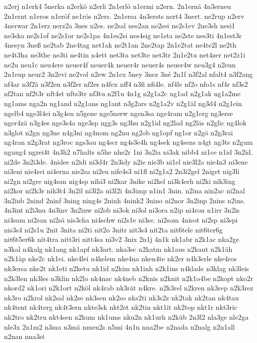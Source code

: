 {n2erj
n1erk4
5nerka
n2erkö
n2erli
2n1erlö
n1ermi
n2ern.
2n1ernä
4n3erneu
2n1ernt
n1eros
n1eröf
ne1rös
n2ers.
2n1ersa
4n3ersts
nert4
3nert.
ne2rup
n2erv
4nerwar
2n1erz
nerz2a
3nes
n2es.
ne2sal
nes2an
ne2sei
ne2s1ev
2ne3sh
nesi1
ne3ska
ne2s1of
ne2s1or
ne2s1pa
4n1es2si
nes4sig
ne1sta
ne2ste
nes3ti
4n1est3r
4nesyn
3neß
ne2tab
2ne4tag
net1ak
ne2t1an
2ne2tap
2n1e2tat
ne4te2l
ne2th
ne4t3ha
ne3the
ne3ti
ne4tin
n4ett
net3ta
net3te
net3tr
2n1e2tu
net4zer
net2z1i
ne2u
neu1c
neu4ere
neuer4f
neuer4k
neuer4r
neuer4s
neuer4w
neu3g4
n2eun
2n1eup
neur2
3n2evi
ne2vol
n2ew
2n1ex
5ney
3nez
3né
2n1f
n3f2al
nfalt4
n3f2ang
nf4ar
n3f2ä
n3f2en
n3f2er
nf2es
n4fex
nff4
n3fi
nfi4le.
nf4le
nf2o
nfo1s
nf4r
nf3s2
nf2tan
nf2t3r
nft4st
nfts3tr
nf3tu
n2f1u
4n1g
n2g1a2c
ng1ad
n2g1ak
ng1a2me
ng1ams
nga2n
ng1and
n2g1ans
ng1ant
n3g2ars
n2g1a2v
n2g1äl
ng3d4
n2g1ein
ngelb4
nge3l4ei
n3g4en
n5gene
nge5nerw
ngen3sa
nge4ram
n2g1erg
ng3erse
nger4zä
n3g4es
nge3s4a
nge3sp
ngg3s
ng3hu
n2g1id
ng2lad
ng2läs
n2glic
ng4lok
n3glot
n2gn
ng3ne
n4g3ni
ng4nom
ng2nu
ng2ob
ng1opf
ng1or
n2gö
n2g3rai
ng4ran
n2g3rat
ng3roc
ngs3au
ng4scr
ng4s3e4h
ng4sek
ng4sens
n4gt
ng3ts
n2gum
ngung4
ngzei4t
4n3h2
n7halts
n5he
nhe2r
1ni
3n2ia
ni3ak
nibb4
ni1ce
n1id
3n2id.
ni2de
3n2i3de.
4nidee
n2idi
ni3d4r
2n3idy
n2ie
nie3b
ni1el
nie3l2a
nie4n3
ni3ene
ni3eni
nie4rei
ni4erna
nie2sa
ni2eu
nife4s3
ni1fl
ni2g1a2
2n3i2gel
2niget
nig3li
ni2gn
ni2gre
nig4san
nig4sp
nihi3
ni2kar
3nike
ni2kel
ni3k4erh
ni2ki
nik3ing
ni2kor
ni2k3r
nik3t4
3n2il
ni3l2a
ni3l2i
4n3imp
n1in1
3nin.
n2ina
nin2ac
ni2nal
3n2inb
2nind
2ninf
3ning
ning4s
2ninh
4nink2
3nino
ni2nor
3n2inp
2nins
n2ins.
4n3int
n2i3nu
4n3inv
3n2inw
ni2ob
ni3ok
ni3ol
ni3ora
n2ip
ni4ron
n1irr
3n2is
ni4sam
ni2san
ni2sä
nis3cha
ni4schw
ni2s1e
ni3se.
ni2som
4nisot
ni2sp
ni3spi
nis3s4
ni2s1u
2nit
3nita
ni2ti
nit2o
3nitr
nit3s4
nit2ta
nit6tele
nit6ter6g
nit6t5er6k
nit4tra
nitt3ri
nitt4sa
ni3v2
3nix
2n1j
4n1k
nk1abr
n2k1ac
nka2ge
n3kal
n4kalg
nk1ang
nk1apf
nk3art.
nka3sc
n2katm
nk1aus
n2kaut
n2k1äh
n2k1äp
nke2c
nk1ei.
nke4lei
n4kelem
nke4na
nken4te
nk2er
n4k3erle
nke4ros
nk3ersa
nke2t
nk1eti
n2ketu
nk1id
n2kim
nk1inh
n2k1ins
n4klade
n3klag
nk3leis
n2k3len
nk3les
n3klin
nk2lo
nk4nac
nk4neb
n2knis
n2knit
n2k1o4be
n2kopt
nko2r
nkord2
nk1ori
n2k1ort
n2köl
nk4rab
nk3rät
n4kre.
n2k3rel
n2kren
nk3rep
n2k3rez
nk3ro
n2krol
nk2sal
nk2se
nk3sen
nk2so
nks2ti
nk3s2z
nk2tak
nk2tan
nk4tau
nk4tent
nk4terg
nk4t3ern
nkte3sk
nkt2et
nk2tin
nkt1it
nk2top
nkt1r
nkt3ric
nk2tro
nk2tru
nkt4sen
n2kum
nk1ums
nku2n
nk1urh
n2küb
2n3l2
nla3ge
nle2ga
nle3x
2n1m2
n3ma
n3mä
nmen2s
n5mi
4n1n
nna2be
n2nada
n2nalg
n2n1all
n2nan
nna3st
}

